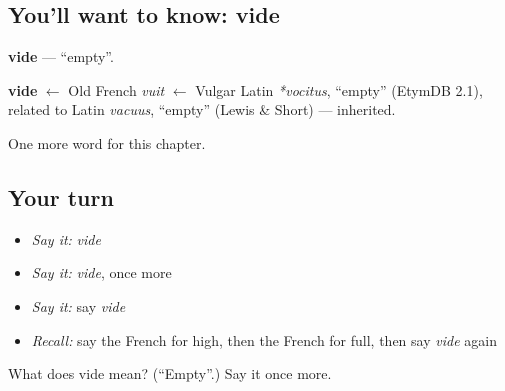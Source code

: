 \subsection*{You'll want to know: vide}
\textbf{vide} — \textquotedblleft{}empty\textquotedblright{}.

\begin{cousinweb}
\textbf{vide} $\leftarrow$ Old French \emph{vuit} $\leftarrow$ Vulgar Latin \emph{*vocitus}, \textquotedblleft{}empty\textquotedblright{} (EtymDB 2.1), related to Latin \emph{vacuus}, \textquotedblleft{}empty\textquotedblright{} (Lewis \& Short) — inherited.
\end{cousinweb}

\begin{grammarlens}[title={What you've built}]
One more word for this chapter.
\end{grammarlens}

\subsection*{Your turn}
\begin{itemize}
\raggedright
  \item \emph{Say it:} \emph{vide}
  \item \emph{Say it:} \emph{vide}, once more
  \item \emph{Say it:} say \emph{vide}
  \item \emph{Recall:} say the French for high, then the French for full, then say \emph{vide} again
\end{itemize}

\begin{tcolorbox}[breakable,colback=teal!4,colframe=teal!35!black,title={Before you move on}]
What does vide mean? (\textquotedblleft{}Empty\textquotedblright{}.) Say it once more.
\end{tcolorbox}
